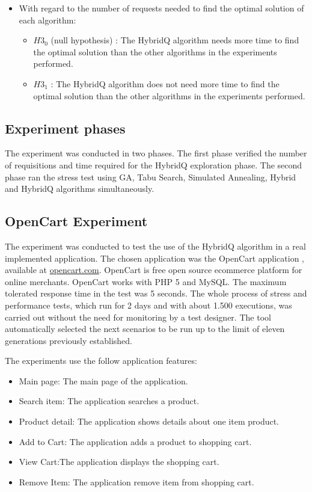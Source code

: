 \documentclass[espaco=umemeio,chapter=TITLE,twoside,openright]{abnt}
\begin{document}
\begin{itemize}
\item With regard to the number of requests needed to find the optimal solution of each algorithm:
\begin{itemize}
\item $H3_{0}$ (null hypothesis) : The HybridQ algorithm needs more time to find the optimal solution than the other algorithms in the experiments performed.
\item $H3_{1}$  : The HybridQ algorithm does not need more time to find the optimal solution than the other algorithms in the experiments performed.
\end{itemize}
\end{itemize}

\subsection{Experiment phases}

The experiment was conducted in two phases. The first phase verified the number of requisitions and time required for the HybridQ exploration phase. The second phase ran the stress test using GA, Tabu Search, Simulated Annealing, Hybrid and HybridQ algorithms simultaneously.

\subsection{OpenCart Experiment}

The experiment was conducted to test the use of the HybridQ algorithm in a real implemented application.  The chosen application was the OpenCart application , available at \url{opencart.com}. OpenCart is free open source ecommerce platform for online merchants. OpenCart works with PHP 5 and MySQL. The maximum tolerated response time in the test was 5 seconds. The whole process of stress and performance tests, which run for 2 days and  with about 1.500 executions, was carried out without the need for monitoring by a test designer. The tool automatically selected the next scenarios to be run up to the limit of eleven generations previously established. 

The experiments use the follow application features:

\begin{itemize}
\item Main page: The main page of the application.
\item Search item: The application searches a product.
\item Product detail: The application shows  details about one item product.
\item Add to Cart: The application adds a product to shopping cart.
\item View Cart:The application displays the shopping cart.
\item Remove Item: The application remove item from shopping cart. 
\end{itemize}
\end{document}
